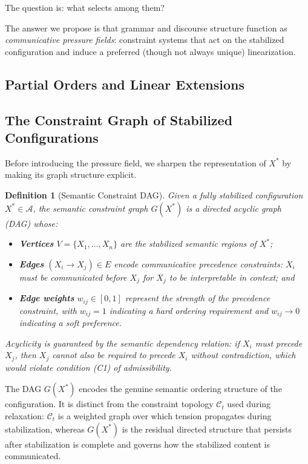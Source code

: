 \documentclass[11pt, a4paper]{article}
\theoremstyle{srn}
\newtheorem{definition}{Definition}[section]
\theoremstyle{srnremark}
\newcommand{\Aspace}{\mathcal{A}}           %
\newcommand{\Cstruct}{\mathcal{C}}           %
\begin{document}
The question is: what selects among them?

The answer we propose is that grammar and discourse structure function
as \emph{communicative pressure fields}: constraint systems that act on
the stabilized configuration and induce a preferred (though not always
unique) linearization.

\subsection{Partial Orders and Linear Extensions}


\subsection{The Constraint Graph of Stabilized Configurations}

Before introducing the pressure field, we sharpen the representation
of $X^*$ by making its graph structure explicit.

\begin{definition}[Semantic Constraint DAG]
\label{def:dag}
Given a fully stabilized configuration $X^* \in \Aspace$, the
\emph{semantic constraint graph} $G(X^*)$ is a directed acyclic graph
(DAG) whose:
\begin{itemize}
  \item \textbf{Vertices} $V = \{X_1, \ldots, X_n\}$ are the
    stabilized semantic regions of $X^*$;
  \item \textbf{Edges} $(X_i \to X_j) \in E$ encode communicative
    precedence constraints: $X_i$ must be communicated before $X_j$
    for $X_j$ to be interpretable in context; and
  \item \textbf{Edge weights} $w_{ij} \in [0,1]$ represent the
    strength of the precedence constraint, with $w_{ij} = 1$
    indicating a hard ordering requirement and $w_{ij} \to 0$
    indicating a soft preference.
\end{itemize}
Acyclicity is guaranteed by the semantic dependency relation:
if $X_i$ must precede $X_j$, then $X_j$ cannot also be required to
precede $X_i$ without contradiction, which would violate condition
(C1) of admissibility.
\end{definition}

The DAG $G(X^*)$ encodes the genuine semantic ordering structure of the
configuration.
It is distinct from the constraint topology $\Cstruct_t$ used during
relaxation: $\Cstruct_t$ is a weighted graph over which tension
propagates during stabilization, whereas $G(X^*)$ is the residual
directed structure that persists after stabilization is complete and
governs how the stabilized content is communicated.
\end{document}
